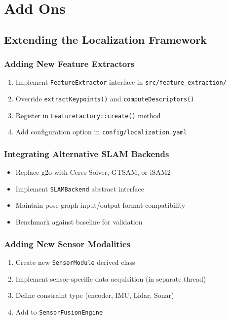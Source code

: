%
%

\chapter{Add Ons}

\section{Extending the Localization Framework}

\subsection{Adding New Feature Extractors}
\begin{enumerate}
    \item Implement \texttt{FeatureExtractor} interface in \texttt{src/feature\_extraction/}
    \item Override \texttt{extractKeypoints()} and \texttt{computeDescriptors()}
    \item Register in \texttt{FeatureFactory::create()} method
    \item Add configuration option in \texttt{config/localization.yaml}
\end{enumerate}

\subsection{Integrating Alternative SLAM Backends}
\begin{itemize}
    \item Replace g2o with Ceres Solver, GTSAM, or iSAM2
    \item Implement \texttt{SLAMBackend} abstract interface
    \item Maintain pose graph input/output format compatibility
    \item Benchmark against baseline for validation
\end{itemize}

\subsection{Adding New Sensor Modalities}
\begin{enumerate}
    \item Create new \texttt{SensorModule} derived class
    \item Implement sensor-specific data acquisition (in separate thread)
    \item Define constraint type (encoder, IMU, Lidar, Sonar)
    \item Add to \texttt{SensorFusionEngine}
\end{enumerate}

